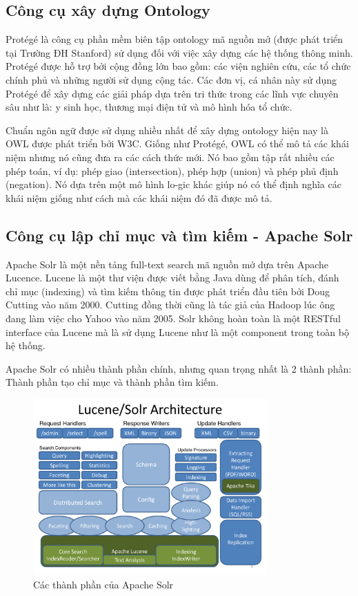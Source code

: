 \subsection{Công cụ xây dựng Ontology}

Protégé là công cụ phần mềm biên tập ontology mã nguồn mở (được phát triển tại Trường ĐH Stanford) sử dụng đối với việc xây dựng các hệ thống thông minh. Protégé được hỗ trợ bởi cộng đồng lớn bao gồm: các viện nghiên cứu, các tổ chức chính phủ và những người sử dụng cộng tác. Các đơn vị, cá nhân này sử dụng Protégé để xây dựng các giải pháp dựa trên tri thức trong các lĩnh vực chuyên sâu như là: y sinh học, thương mại điện tử và mô hình hóa tổ chức.

Chuẩn ngôn ngữ được sử dụng nhiều nhất để xây dựng ontology hiện nay là OWL\cite{antoniou2004web} được phát triển bởi W3C. Giống như Protégé, OWL có thể mô tả các khái niệm nhưng nó cũng đưa ra các cách thức mới. Nó bao gồm tập rất nhiều các phép toán, ví dụ: phép giao (intersection), phép hợp (union) và phép phủ định (negation). Nó dựa trên một mô hình lo-gic khác giúp nó có thể định nghĩa các khái niệm giống như cách mà các khái niệm đó đã được mô tả.

\subsection{Công cụ lập chỉ mục và tìm kiếm - Apache Solr}

Apache Solr là một nền tảng full-text search mã nguồn mở dựa trên Apache Lucence. Lucene là một thư viện được viết bằng Java dùng để phân tích, đánh chỉ mục (indexing) và tìm kiếm thông tin được phát triển đầu tiên bởi Doug Cutting vào năm 2000. Cutting đồng thời cũng là tác giả của Hadoop lúc ông đang làm việc cho Yahoo vào năm 2005. Solr không hoàn toàn là một RESTful interface của Lucene mà là sử dụng Lucene như là một component trong toàn bộ hệ thống.

Apache Solr có nhiều thành phần chính, nhưng quan trọng nhất là 2 thành phần: Thành phần tạo chỉ mục và thành phần tìm kiếm.


\begin{figure}[H]
    \centering
    \includegraphics[width=0.8\textwidth]{img/solr-achitecture.png}
    \caption{Các thành phần của Apache Solr}
\end{figure}

